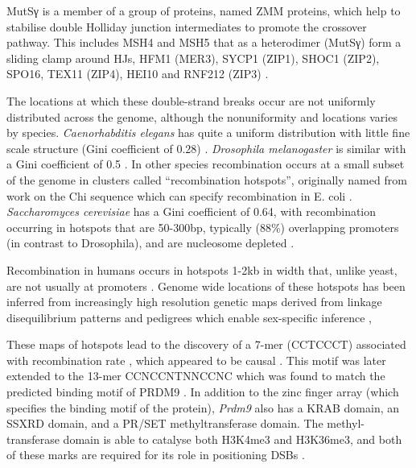 MutSγ is a member of a group of proteins, named ZMM proteins, which help to stabilise double Holliday junction intermediates to promote the crossover pathway.
This includes MSH4 and MSH5 that as a heterodimer (MutSγ) form a sliding clamp around HJs, HFM1 (MER3), SYCP1 (ZIP1), SHOC1 (ZIP2), SPO16, TEX11 (ZIP4), HEI10 and RNF212 (ZIP3) \parencite[reviewed in][]{Pyatnitskaya2019Crossing}.


The locations at which these double-strand breaks occur are not uniformly distributed across the genome, although the nonuniformity and locations varies by species.
\textit{Caenorhabditis elegans} has quite a uniform distribution with little fine scale structure (Gini coefficient of 0.28) \parencite{Rockman2009Recombinational, Kaur2014Crossover}.
\textit{Drosophila melanogaster} is similar with a Gini coefficient of 0.5 \parencite{Chan2012GenomeWide, SmukowskiHeil2015Recombining}.
In other species recombination occurs at a small subset of the genome in clusters called ``recombination hotspots'', originally named from work on the Chi sequence which can specify recombination in E. coli \parencite{Lam1974RecMediated, Myers1994RecBC}.
\textit{Saccharomyces cerevisiae} has a Gini coefficient of 0.64, with recombination occurring in hotspots that are 50-300bp, typically (88\%) overlapping promoters (in contrast to Drosophila), and are nucleosome depleted \parencite{Baudat1997Clustering, Wu1994Meiosisinduced, Mancera2008Highresolution, Pan2011Hierarchical, Lam2015Nonparadoxical}.

Recombination in humans occurs in hotspots 1-2kb in width that, unlike yeast, are not usually at promoters \parencite{Jeffreys2001Intensely}.
Genome wide locations of these hotspots has been inferred from increasingly high resolution genetic maps derived from linkage disequilibrium patterns \parencite{McVean2004finescale, Myers2005FineScale, TheInternationalHapMapConsortium2007second, Coop2008HighResolution} and pedigrees which enable sex-specific inference \parencite{Kong2002highresolution, Kong2010Finescale, Kong2014Common, Bherer2017Refined, Halldorsson2019Characterizing},

These maps of hotspots lead to the discovery of a 7-mer (CCTCCCT) associated with recombination rate \parencite{Myers2005FineScale}, which appeared to be causal \parencite{Jeffreys2002Reciprocal}.
This motif was later extended to the 13-mer CCNCCNTNNCCNC \parencite{Myers2008common} which was found to match the predicted binding motif of PRDM9 \parencite{Myers2010Drive, Baudat2010PRDM9, Parvanov2010Prdm9, Berg2010PRDM9}.
In addition to the zinc finger array (which specifies the binding motif of the protein), \textit{Prdm9} also has a KRAB domain, an SSXRD domain, and a PR/SET methyltransferase domain.
The methyl-transferase domain is able to catalyse both H3K4me3 and H3K36me3, and both of these marks are required for its role in positioning DSBs \parencite{Powers2016Meiotic, Diagouraga2018PRDM9}.

